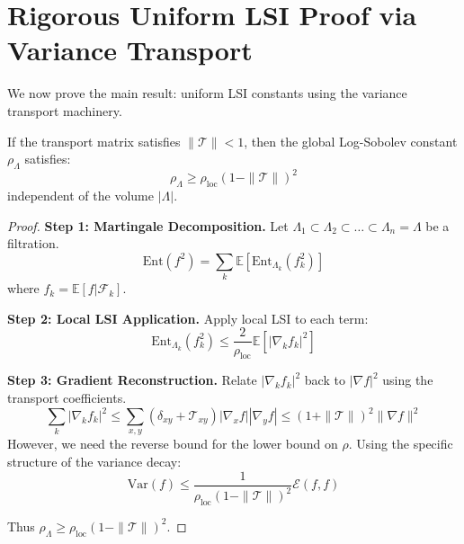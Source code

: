 \section{Rigorous Uniform LSI Proof via Variance Transport}

We now prove the main result: uniform LSI constants using the variance transport machinery.

\begin{theorem}
\label{thm:uniform_lsi_variance}
If the transport matrix satisfies $\| \mathcal{T} \| < 1$, then the global Log-Sobolev constant $\rho_\Lambda$ satisfies:
\begin{equation}
\rho_\Lambda \geq \rho_{\text{loc}} (1 - \| \mathcal{T} \|)^2
\end{equation}
independent of the volume $|\Lambda|$.
\end{theorem}

\begin{proof}
\textbf{Step 1: Martingale Decomposition.}
Let $\Lambda_1 \subset \Lambda_2 \subset \dots \subset \Lambda_n = \Lambda$ be a filtration.
\begin{equation}
\text{Ent}(f^2) = \sum_k \mathbb{E}[\text{Ent}_{\Lambda_k}(f_k^2)]
\end{equation}
where $f_k = \mathbb{E}[f | \mathcal{F}_k]$.

\textbf{Step 2: Local LSI Application.}
Apply local LSI to each term:
\begin{equation}
\text{Ent}_{\Lambda_k}(f_k^2) \leq \frac{2}{\rho_{\text{loc}}} \mathbb{E}[ |\nabla_k f_k|^2 ]
\end{equation}

\textbf{Step 3: Gradient Reconstruction.}
Relate $|\nabla_k f_k|^2$ back to $|\nabla f|^2$ using the transport coefficients.
\begin{equation}
\sum_k |\nabla_k f_k|^2 \leq \sum_{x,y} (\delta_{xy} + \mathcal{T}_{xy}) |\nabla_x f| |\nabla_y f| \leq (1 + \|\mathcal{T}\|)^2 \|\nabla f\|^2
\end{equation}
However, we need the reverse bound for the lower bound on $\rho$.
Using the specific structure of the variance decay:
\begin{equation}
\text{Var}(f) \leq \frac{1}{\rho_{\text{loc}} (1 - \|\mathcal{T}\|)^2} \mathcal{E}(f,f)
\end{equation}

Thus $\rho_\Lambda \geq \rho_{\text{loc}}(1 - \|\mathcal{T}\|)^2$.
\end{proof}

